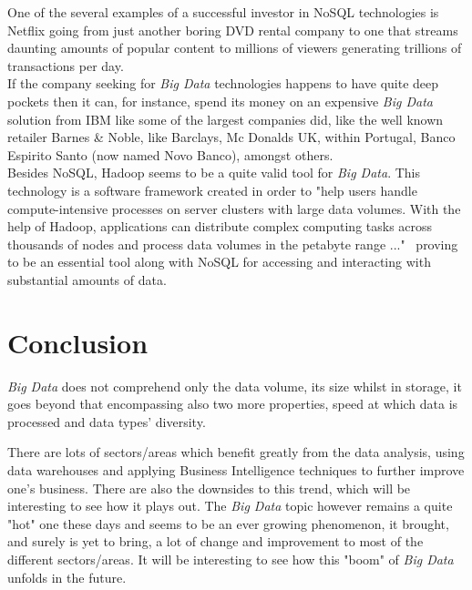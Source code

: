 \documentclass{llncs}
\begin{document}
One of the several examples of a successful investor in NoSQL technologies is Netflix going from just another boring DVD rental company to one that streams daunting amounts of popular content to millions of viewers generating trillions of transactions per day.~\cite{Hirleman2014}\\ 

If the company seeking for \textit{Big Data} technologies happens to have quite deep pockets then it can, for instance, spend its money on an expensive \textit{Big Data} solution from IBM like some of the largest companies did, like the well known retailer Barnes \& Noble, like Barclays, Mc Donalds UK, within Portugal, Banco Espirito Santo (now named Novo Banco), amongst others.~\cite{IBMcases}~\cite{Hirleman2014}~\cite{Dix2014}~\cite{Oliver2014}\\

Besides NoSQL, Hadoop seems to be a quite valid tool for \textit{Big Data}. This technology is a software framework created in order to "help users handle compute-intensive processes on server clusters with large data volumes. With the help of Hadoop, applications can distribute complex computing tasks across thousands of nodes and process data volumes in the petabyte range ..."~\cite{Konrad} proving to be an essential tool along with NoSQL for accessing and interacting with substantial amounts of data. ~\cite{IBMHad}~\cite{Kelly2013}~\cite{Oliver2014}~\cite{Mitchell2014}~\cite{Lo}~\cite{Russom2011}



\section{Conclusion}

\textit{Big Data} does not comprehend only the data volume, its size whilst in storage, it goes beyond that encompassing also two more properties, speed at which data is processed and data types' diversity. ~\cite{Russom2011}

There are lots of sectors/areas which benefit greatly from the data analysis, using data warehouses and applying Business Intelligence techniques to further improve one's business. There are also the downsides to this trend, which will be interesting to see how it plays out.
The \textit{Big Data} topic however remains a quite "hot" one these days and seems to be an ever growing phenomenon, it brought, and surely is yet to bring, a lot of change and improvement to most of the different sectors/areas. It will be interesting to see how this "boom" of \textit{Big Data} unfolds in the future.   



\end{document}

